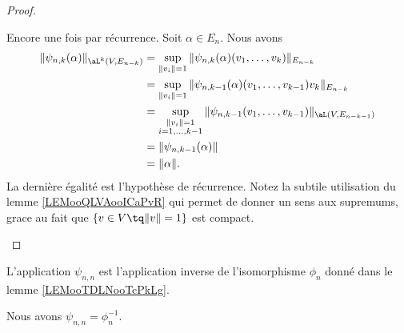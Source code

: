 \begin{proof}
\begin{subproof}
		\spitem[Isométrique]
		Encore une fois par récurrence. Soit \( \alpha\in E_n\). Nous avons
		\begin{subequations}
			\begin{align}
				\| \psi_{n,k}(\alpha) \|_{\aL^k(V,E_{n-k})} & =\sup_{\| v_i \|=1}\| \psi_{n,k}(\alpha)(v_1,\ldots, v_k) \|_{E_{n-k}}          \\
				                                            & =\sup_{\| v_i \|=1}\| \psi_{n,k-1}(\alpha)(v_1,\ldots, v_{k-1})v_k \|_{E_{n-k}} \\
				                                            & =\sup_{\substack{\| v_i \|=1                                                    \\i=1,\ldots, k-1}}\| \psi_{n,k-1}(v_1,\ldots, v_{k-1}) \|_{\aL(V,E_{n-k-1})}\\
				                                            & =\| \psi_{n,k-1}(\alpha) \|                                                     \\
				                                            & =\| \alpha \|.
			\end{align}
		\end{subequations}
		La dernière égalité est l'hypothèse de récurrence. Notez la subtile utilisation du lemme \ref{LEMooQLVAooICaPvR} qui permet de donner un sens aux supremums, grace au fait que \( \{ v\in V\tq \| v \|=1 \}\) est compact.
	\end{subproof}
\end{proof}

L'application \( \psi_{n,n}\) est l'application inverse de l'isomorphisme \( \phi_n\) donné dans le lemme \ref{LEMooTDLNooTcPkLg}.



\begin{lemma}       \label{LEMooFBEGooCqrzxH}
	Nous avons \( \psi_{n,n}=\phi_n^{-1}\).
\end{lemma}

